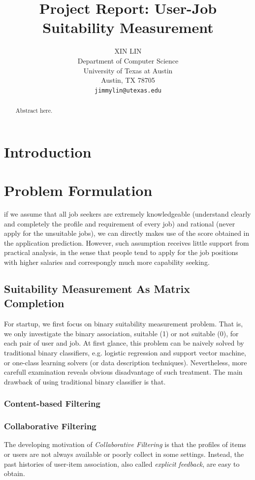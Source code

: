 \documentclass{article} %
\title{Project Report: User-Job Suitability Measurement}
\author{
XIN LIN \\
Department of Computer Science\\
University of Texas at Austin \\
Austin, TX 78705 \\
\texttt{jimmylin@utexas.edu} \\
}
\begin{document}
\maketitle

\begin{abstract}
    Abstract here.
\end{abstract}

\section{Introduction}

\section{Problem Formulation}

if we assume that all job seekers are extremely knowledgeable (understand
clearly and completely the profile and requirement of every job) and rational
(never apply for the unsuitable jobs), we can directly makes use of the score
obtained in the application prediction. However, such assumption receives
little support from practical analysis, in the sense that people tend to apply
for the job positions with higher salaries and correspongly much more
capability seeking.

\subsection{Suitability Measurement As Matrix Completion}
For startup, we first focus on binary suitability measurement problem. That
is, we only investigate the binary association, suitable (1) or not suitable
(0), for each pair of user and job. 
At first glance, this problem can be naively solved by traditional binary
classifiers, e.g. logistic regression and support vector machine, or one-class
learning solvers (or data description techniques).
Nevertheless, more carefull examination reveals obvious disadvantage of such
treatment. The main drawback of using traditional binary classifier is that.

\subsubsection{Content-based Filtering}

\subsubsection{Collaborative Filtering}
The developing motivation of {\it Collaborative Filtering} is that the
profiles of items or users are not always available or poorly collect in
some settings. Instead, the past histories of user-item association, also called {\it
    explicit feedback}, are easy to obtain.  
\end{document}
